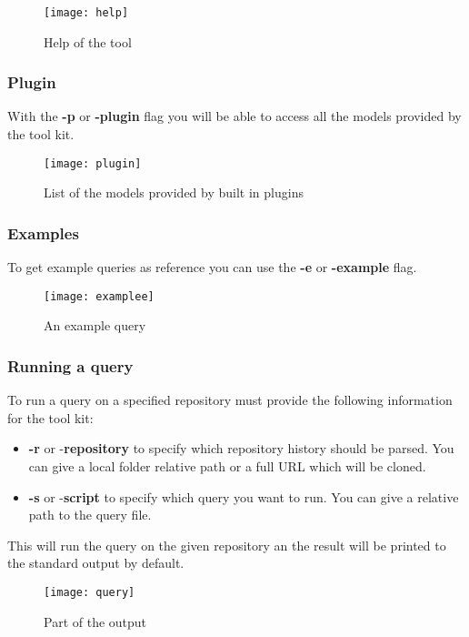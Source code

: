\begin{figure}[H]
	\centering
	\texttt{[image: help]}
	\caption{Help of the tool}
	\label{fig:fig-help}
\end{figure}

\subsubsection{Plugin}
With the \textbf{-p} or \textbf{-plugin} flag you will be able to access all the models provided by the tool kit.

\begin{figure}[H]
	\centering
	\texttt{[image: plugin]}
	\caption{List of the models provided by built in plugins}
	\label{fig:fig-plugin}
\end{figure}

\subsubsection{Examples}
To get example queries as reference you can use the \textbf{-e} or \textbf{-example} flag.

\begin{figure}[H]
	\centering
	\texttt{[image: examplee]}
	\caption{An example query}
	\label{fig:fig-example}
\end{figure}

\subsubsection{Running a query}
To run a query on a specified repository must provide the following information for the tool kit:

\begin{itemize}
	\item \textbf{-r} or -\textbf{repository} to specify which repository history should be parsed. You can give a local folder relative path or a full URL which will be cloned.
	\item \textbf{-s} or -\textbf{script} to specify which query you want to run. You can give a relative path to the query file.
\end{itemize}

This will run the query on the given repository an the result will be printed to the standard output by default.

\begin{figure}[H]
	\centering
	\texttt{[image: query]}
	\caption{Part of the output}
	\label{fig:fig-query}
\end{figure}


